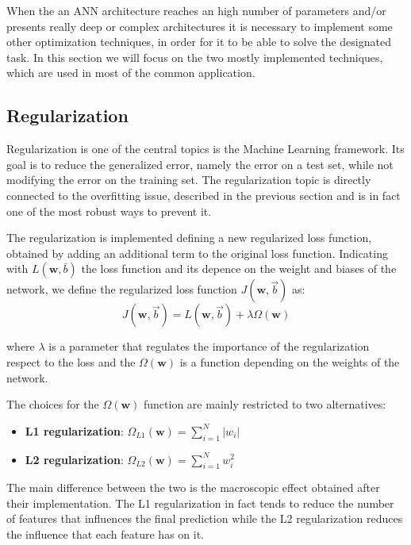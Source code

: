 When the an ANN architecture reaches an high number of parameters and/or  presents really deep or complex architectures it is necessary to implement some other optimization techniques, in order for it to be able to solve the designated task. In this section we will focus on the two mostly implemented techniques, which are used in most of the common application.

\subsection{Regularization}\label{regularization}

Regularization is one of the central topics is the Machine Learning framework. Its goal is to reduce the generalized error, namely the error on a test set, while not modifying the error on the training set. The regularization topic is directly connected to the overfitting issue, described in the previous section and is in fact one of the most robust ways to prevent it. 

The regularization is implemented defining a new regularized loss function, obtained by adding an additional term to the original loss function. Indicating with $L(\boldsymbol{w},\bar{b})$ the loss function and its depence on the weight and biases of the network, we define the regularized loss function $J(\mathbf{w}, \vec{b})$ as:
\begin{equation}
J(\mathbf{w}, \vec{b})=L(\mathbf{w}, \vec{b})+ \lambda\Omega(\mathbf{w})
\end{equation}

where $\lambda$ is a parameter that regulates the importance of the regularization respect to the loss and the $\Omega(\mathbf{w})$ is a function depending on the weights of the network. 

The choices for the $\Omega(\mathbf{w})$ function are mainly restricted to two alternatives:
\begin{itemize}
    \item \textbf{L1 regularization}: $\Omega_{L1}(\mathbf{w}) = \sum_{i=1}^N |w_i|$
    \item \textbf{L2 regularization}: $\Omega_{L2}(\mathbf{w}) = \sum_{i=1}^N w_i^2$
\end{itemize}

The main difference between the two is the macroscopic effect obtained after their implementation. The L1 regularization in fact tends to reduce the number of features that influences the final prediction while the L2 regularization reduces the influence that each feature has on it.


